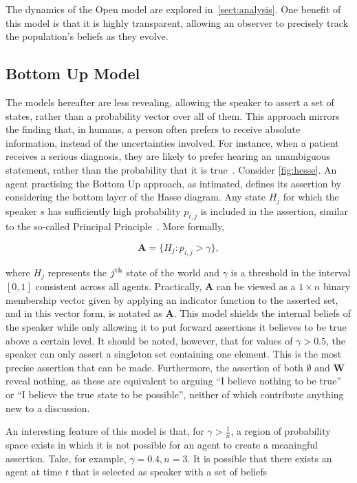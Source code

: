 The dynamics of the Open model are explored in~\cref{sect:analysis}. One benefit of this model is that it is highly transparent, allowing an observer to precisely track the population's beliefs as they evolve. 


\subsection*{Bottom Up Model}

The models hereafter are less revealing, allowing the speaker to assert a set of states, rather than a probability vector over all of them. This approach mirrors the finding that, in humans, a person often prefers to receive absolute information, instead of the uncertainties involved. For instance, when a patient receives a serious diagnosis, they are likely to prefer hearing an unambiguous statement, rather than the probability that it is true~\cite{Fischhoff1982LayRisk}. Consider \cref{fig:hesse}. An agent practising the Bottom Up approach, as intimated, defines its assertion by considering the bottom layer of the Hasse diagram. Any state $H_j$ for which the speaker $s$ has sufficiently high probability $p_{i,j}$ is included in the assertion, similar to the so-called Principal Principle~\cite{IgorDouven2006AssertionCredibility, Lewis1980AChance}. More formally, 

\begin{equation}
    \mathbf{A} = \{ H_j: p_{i,j} > \gamma  \},
\end{equation}

where $H_j$ represents the $j^{\textnormal{th}}$ state of the world and $\gamma$ is a threshold in the interval $[0,1]$ consistent across all agents. Practically, $\mathbf{A}$ can be viewed as a $1 \times n$ binary membership vector given by applying an indicator function to the asserted set, and in this vector form, is notated as $\underline{\mathbf{A}}$. This model shields the internal beliefs of the speaker while only allowing it to put forward assertions it believes to be true above a certain level. It should be noted, however, that for values of $\gamma > 0.5$, the speaker can only assert a singleton set containing one element. This is the most precise assertion that can be made. Furthermore, the assertion of both $\emptyset$ and $\mathbf{W}$ reveal nothing, as these are equivalent to arguing ``I believe nothing to be true'' or ``I believe the true state to be possible'', neither of which contribute anything new to a discussion. 

An interesting feature of this model is that, for $\gamma > \frac{1}{n}$, a region of probability space exists in which it is not possible for an agent to create a meaningful assertion. Take, for example, $\gamma = 0.4, n=3$. It is possible that there exists an agent at time $t$ that is selected as speaker with a set of beliefs

